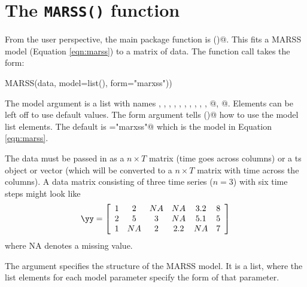 \chapter{The \texttt{MARSS()} function}\label{chap:MARSS}

From the user perspective, the main package function is \verb@MARSS()@.  This fits a MARSS model (Equation \ref{eqn:marss}) to a matrix of data. The function call takes the form:
\begin{Schunk}
\begin{Sinput}
MARSS(data, model=list(), form="marxss")) 
\end{Sinput}
\end{Schunk}
The model argument is a list with names \verb@B@, \verb@U@, \verb@C@, \verb@c@, \verb@Q@, \verb@Z@, \verb@A@, \verb@D@, \verb@d@, \verb@R@, @, @.  Elements can be left off to use default values.  The form argument tells \verb@MARSS()@ how to use the model list elements.  The default is \verb@form="marxss"@ which is the model in Equation \ref{eqn:marss}.

The data must be passed in as a $n \times T$ matrix (time goes across columns) or a ts object or vector (which will be converted to a $n \times T$ matrix with time across the columns). A data matrix consisting of three time series ($n=3$) with six time steps might look like
\begin{equation*}
\yy = \left[ \begin{array}{ccccccc}
    1 & 2 & NA & NA & 3.2 & 8\\
    2 & 5 &  3 & NA & 5.1 & 5\\
    1 & NA & 2 & 2.2 & NA & 7\end{array} \right]
\end{equation*}
where NA denotes a missing value.

The argument \verb@model@ specifies the structure of the MARSS model.  It is a list, where the list elements for each model parameter specify the form of that parameter.  

